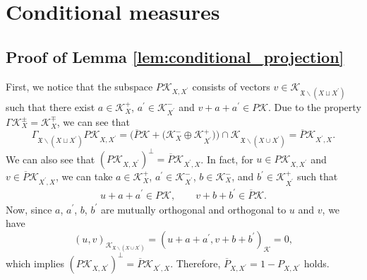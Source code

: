\documentclass[pdftex]{sigma}
\numberwithin{equation}{section}
\newcommand{\pr}[1]{#1^{\prime}}
\newcommand{\mfrak}[1]{\mathfrak{#1}}
\newcommand{\mcal}[1]{\mathcal{#1}}
\begin{document}
\section{Conditional measures}\label{sect:conditional_measures}
\subsection{Proof of Lemma \ref{lem:conditional_projection}}
First, we notice that the subspace $P\mcal{K}_{X,\pr{X}}$ consists of vectors $v\in \mcal{K}_{\mfrak{X}\backslash(X\sqcup\pr{X})}$ such that there exist $a\in \mcal{K}_{X}^{+}$, $\pr{a}\in \mcal{K}_{\pr{X}}^{-}$ and $v+a+\pr{a}\in P\mcal{K}$. Due to the property $\Gamma \mcal{K}_{X}^{\pm}=\mcal{K}_{X}^{\mp}$, we can see that
\begin{equation*}
	\Gamma_{\mfrak{X}\backslash(X\sqcup\pr{X})} P\mcal{K}_{X,\pr{X}}=\big(\overline{P}\mcal{K}+\big(\mcal{K}_{X}^{-}\oplus \mcal{K}_{\pr{X}}^{+}\big)\big)\cap \mcal{K}_{\mfrak{X}\backslash (X\cup \pr{X})}=\overline{P}\mcal{K}_{\pr{X},X}.
\end{equation*}
We can also see that $ (P\mcal{K}_{X,\pr{X}})^{\perp}=\overline{P}\mcal{K}_{\pr{X},X}$. In fact, for $u\in P\mcal{K}_{X,\pr{X}}$ and $v\in \overline{P}\mcal{K}_{\pr{X},X}$, we can take $a\in \mcal{K}_{X}^{+}$, $\pr{a}\in \mcal{K}_{\pr{X}}^{-}$, $b\in \mcal{K}_{X}^{-}$, and $\pr{b}\in \mcal{K}_{\pr{X}}^{+}$ such that
\begin{gather*}
	u+a+\pr{a} \in P\mcal{K}, \qquad v+b+\pr{b}\in \overline{P}\mcal{K}.
\end{gather*}
Now, since $a$, $\pr{a}$, $b$, $\pr{b}$ are mutually orthogonal and orthogonal to $u$ and $v$, we have
\begin{equation*}
	(u,v)_{\mcal{K}_{\mfrak{X}\backslash (X\cup\pr{X})}}=(u+a+\pr{a},v+b+\pr{b})_{\mcal{K}}=0,
\end{equation*}
which implies $(P\mcal{K}_{X,\pr{X}})^{\perp}=\overline{P}\mcal{K}_{\pr{X},X}$.
Therefore, $\overline{P}_{X,\pr{X}}=1-P_{X,\pr{X}}$ holds.
\end{document}
